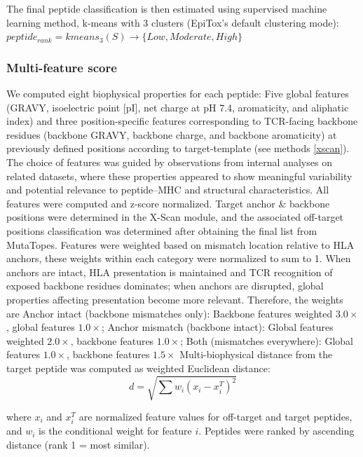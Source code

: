 \documentclass[unnumsec,webpdf,contemporary,large]{oup-authoring-template}%
\theoremstyle{thmstyleone}%
\theoremstyle{thmstyletwo}%
\theoremstyle{thmstylethree}%
\begin{document}
        The final peptide classification is then estimated using supervised machine learning method, k-means with 3 clusters (EpiTox’s default clustering mode): $peptide_{rank}= kmeans_3(S)→\{Low,Moderate,High\}$
        
        \subsubsection{\textbf{Multi-feature score}}\label{annotopes_multi}
        We computed eight biophysical properties for each peptide: Five global features (GRAVY, isoelectric point [pI], net charge at pH 7.4, aromaticity, and aliphatic index) and three position-specific features corresponding to TCR-facing backbone residues (backbone GRAVY, backbone charge, and backbone aromaticity) at previously defined positions according to target-template (see methods \ref{xscan}). The choice of features was guided by observations from internal analyses on related datasets, where these properties appeared to show meaningful variability and potential relevance to peptide–MHC and structural characteristics.
        All features were computed and z-score normalized. Target anchor \& backbone positions were determined in the X-Scan module, and the associated off-target positions classification was determined after obtaining the final list from MutaTopes.
        Features were weighted based on mismatch location relative to HLA anchors, these weights within each category were normalized to sum to 1. When anchors are intact, HLA presentation is maintained and TCR recognition of exposed backbone residues dominates; when anchors are disrupted, global properties affecting presentation become more relevant. Therefore, the weights are Anchor intact (backbone mismatches only): Backbone features weighted $3.0\times$, global features $1.0\times$; Anchor mismatch (backbone intact): Global features weighted $2.0\times$, backbone features $1.0\times$; Both (mismatches everywhere): Global features $1.0\times$, backbone features $1.5\times$
        Multi-biophysical distance from the target peptide was computed as weighted Euclidean distance:
        \begin{equation}
            d = \sqrt{\sum w_i (x_i - x^T_i)^2}
        \end{equation}
        
        where $x_i$ and $x^T_i$ are normalized feature values for off-target and target peptides, and $w_i$ is the conditional weight for feature $i$. Peptides were ranked by ascending distance (rank 1 = most similar).
\end{document}
